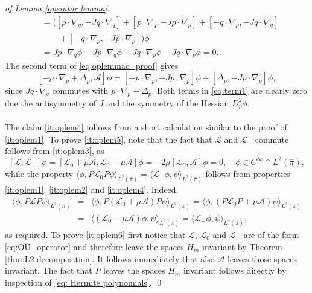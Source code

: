 \begin{proof}[of Lemma \ref{operator lemma}]
\begin{align*}
	& =\big([p\cdot\nabla_{q},-Jq\cdot\nabla_{q}]+[p\cdot\nabla_{q},-Jp\cdot\nabla_{p}]+[-q\cdot\nabla_{p},-Jq\cdot\nabla_{q}] \\
	& \qquad +[-q\cdot\nabla_{p},-Jp\cdot\nabla_{p}]\big)\phi\\
	&= Jp\cdot\nabla_{q}\phi-Jp\cdot\nabla_{q}\phi+Jq\cdot\nabla_{p}\phi-Jq\cdot\nabla_{p}\phi=0.
	\end{align*}
	The second term of \eqref{eq:oplemmac_proof} gives 
	\begin{equation}
	\label{eq:term1}
	[-p\cdot\nabla_{p}+\Delta_{p},\mathcal{A}]\phi =[-p\cdot\nabla_{p},-Jp\cdot\nabla_{p}]\phi+[\Delta_{p},-Jp\cdot\nabla_{p}]\phi,
	\end{equation}
	since $Jq\cdot\nabla_{q}$ commutes with $p\cdot\nabla_{p}+\Delta_{p}$. Both  terms in \eqref{eq:term1} are clearly zero due the antisymmetry of $J$ and the symmetry of the Hessian $D^2_p \phi$. 
	\\\\
	The claim \ref{it:oplem4} follows from a short calculation similar to the proof of  \ref{it:oplem1}.  To prove \ref{it:oplem5}, note that the fact that $\mathcal{L}$ and $\mathcal{L}_{-}$ commute follows from \ref{it:oplem3}, as 
	\[
	[\mathcal{L},\mathcal{L}_{-}]\phi=[\mathcal{L}_{0}+\mu\mathcal{A},\mathcal{L}_{0}-\mu\mathcal{A}]\phi=-2\mu[\mathcal{L}_{0},\mathcal{A}]\phi=0,\quad \phi \in C^{\infty}\cap L^2(\widehat{\pi}),
	\]
	while the property $\langle \phi ,P\mathcal{L}_{0}P\psi\rangle_{L^{2}(\widehat{\pi})}=\langle\mathcal{L}_{-}\phi,\psi\rangle_{ L^{2}(\widehat{\pi})}$ follows from properties \ref{it:oplem1}, \ref{it:oplem2} and \ref{it:oplem4}. Indeed,
	\begin{subequations}
	\begin{eqnarray*}
	\langle \phi,P\mathcal{L}P\psi\rangle_{ L^{2}(\widehat{\pi})}& = & \langle \phi, P(\mathcal{L}_{0}+\mu\mathcal{A})P\psi\rangle_{ L^{2}(\widehat{\pi})}=\langle\phi,\left(P\mathcal{L}_{0}P+\mu\mathcal{A}\right)\psi\rangle_{ L^{2}(\widehat{\pi})} \\	
	 & = & \langle (\mathcal{L}_{0}-\mu\mathcal{A})\phi,\psi\rangle_{ L^{2}(\widehat{\pi})}=\langle\mathcal{L}_{-}\phi,\psi\rangle_{ L^{2}(\widehat{\pi})}, 
\end{eqnarray*}
\end{subequations}
	as required. To prove \ref{it:oplem6} first notice that $\mathcal{L}$, $\mathcal{L}_0$ and $\mathcal{L}_{-}$ are of the form \eqref{eq:OU_operator} and therefore leave the spaces $H_m$ invariant by Theorem \ref{thm:L2 decomposition}. It follows immediately that also $\mathcal{A}$ leaves those spaces invariant. The fact that $P$ leaves the spaces $H_m$ invariant follows directly by inspection of \eqref{eq: Hermite polynomials}.
	\qed
\end{proof}

